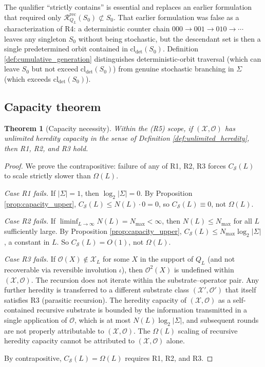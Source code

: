 \documentclass[11pt]{article}
\theoremstyle{plain}
\newtheorem{theorem}{Theorem}
\theoremstyle{definition}
\newcommand{\Csub}{C_{\mathcal{S}}}
\newcommand{\Xset}{\mathcal{X}}
\newcommand{\Op}{\mathcal{O}}
\newcommand{\Reach}{\mathcal{R}}
\begin{document}
The qualifier ``strictly contains'' is essential and replaces an earlier formulation that required only $\Reach^{\mathrm{rec}}_{Q_L}(S_0) \not\subset S_0$. That earlier formulation was false as a characterization of R4: a deterministic counter chain $000 \to 001 \to 010 \to \cdots$ leaves any singleton $S_0$ without being stochastic, but the descendant set is then a single predetermined orbit contained in $\mathrm{cl}_{\det}(S_0)$. Definition \ref{def:cumulative_generation} distinguishes deterministic-orbit traversal (which can leave $S_0$ but not exceed $\mathrm{cl}_{\det}(S_0)$) from genuine stochastic branching in $\Sigma$ (which exceeds $\mathrm{cl}_{\det}(S_0)$).

\subsection{Capacity theorem}
\label{subsec:capacity_thm}

\begin{theorem}[Capacity necessity]
\label{thm:supp_capacity}
Within the (R5) scope, if $(\Xset, \Op)$ has unlimited heredity capacity in the sense of Definition \ref{def:unlimited_heredity}, then R1, R2, and R3 hold.
\end{theorem}

\begin{proof}
We prove the contrapositive: failure of any of R1, R2, R3 forces $\Csub(L)$ to scale strictly slower than $\Omega(L)$.

\emph{Case R1 fails.} If $|\Sigma| = 1$, then $\log_2 |\Sigma| = 0$. By Proposition \ref{prop:capacity_upper}, $\Csub(L) \le N(L) \cdot 0 = 0$, so $\Csub(L) \equiv 0$, not $\Omega(L)$.

\emph{Case R2 fails.} If $\liminf_{L \to \infty} N(L) = N_{\max} < \infty$, then $N(L) \le N_{\max}$ for all $L$ sufficiently large. By Proposition \ref{prop:capacity_upper}, $\Csub(L) \le N_{\max} \log_2 |\Sigma|$, a constant in $L$. So $\Csub(L) = O(1)$, not $\Omega(L)$.

\emph{Case R3 fails.} If $\Op(X) \notin \Xset_L$ for some $X$ in the support of $Q_L$ (and not recoverable via reversible involution $\iota$), then $\Op^2(X)$ is undefined within $(\Xset, \Op)$. The recursion does not iterate within the substrate--operator pair. Any further heredity is transferred to a different substrate class $(\Xset', \Op')$ that itself satisfies R3 (parasitic recursion). The heredity capacity of $(\Xset, \Op)$ as a self-contained recursive substrate is bounded by the information transmitted in a single application of $\Op$, which is at most $N(L) \log_2 |\Sigma|$, and subsequent rounds are not properly attributable to $(\Xset, \Op)$. The $\Omega(L)$ scaling of recursive heredity capacity cannot be attributed to $(\Xset, \Op)$ alone.

By contrapositive, $\Csub(L) = \Omega(L)$ requires R1, R2, and R3.
\end{proof}
\end{document}
